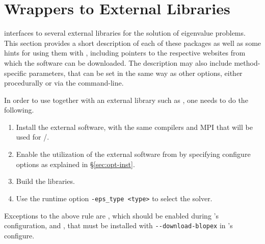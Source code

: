


\section{Wrappers to External Libraries}
\label{sec:wrap}

	\slepc interfaces to several external libraries for the solution of eigenvalue problems. This section provides a short description of each of these packages as well as some hints for using them with \slepc, including pointers to the respective websites from which the software can be downloaded. The description may also include method-specific parameters, that can be set in the same way as other \slepc options, either procedurally or via the command-line.

	In order to use \slepc together with an external library such as \arpack, one needs to do the following.
	\begin{enumerate}
	\item Install the external software, with the same compilers and MPI that will be used for \petsc/\slepc.
	\item Enable the utilization of the external software from \slepc by specifying configure options as explained in \S\ref{sec:opt-inst}.
 	\item Build the \slepc libraries.
	\item Use the runtime option \Verb!-eps_type <type>! to select the solver.
	\end{enumerate}

	Exceptions to the above rule are \lapack, which should be enabled during \petsc's configuration, and \blopex, that must be installed with \Verb!--download-blopex! in \slepc's configure.

